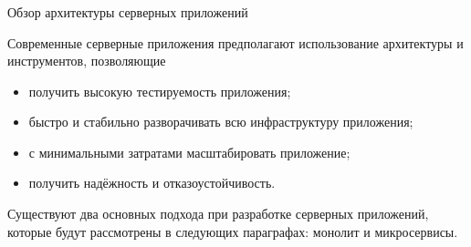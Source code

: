 \subsubsection{} Обзор архитектуры серверных приложений
\label{sec:analysis:research:mobArch}

Современные серверные приложения предполагают использование архитектуры и инструментов, позволяющие

\begin{itemize}
\item получить высокую тестируемость приложения;
\item быстро и стабильно разворачивать всю инфраструктуру приложения;
\item с минимальными затратами масштабировать приложение;
\item получить надёжность и отказоустойчивость.
\end{itemize}

Существуют два основных подхода при разработке серверных приложений, которые будут рассмотрены в следующих параграфах: монолит и микросервисы.

